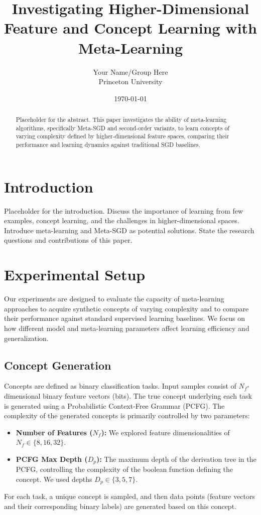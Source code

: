 \documentclass[11pt, a4paper]{article}
\title{Investigating Higher-Dimensional Feature and Concept Learning with Meta-Learning}
\author{Your Name/Group Here \\ Princeton University} %
\date{\today}
\begin{document}
\maketitle
\begin{abstract}
Placeholder for the abstract. This paper investigates the ability of meta-learning algorithms, specifically Meta-SGD and second-order variants, to learn concepts of varying complexity defined by higher-dimensional feature spaces, comparing their performance and learning dynamics against traditional SGD baselines.
\end{abstract}

\section{Introduction}
Placeholder for the introduction.
Discuss the importance of learning from few examples, concept learning, and the challenges in higher-dimensional spaces.
Introduce meta-learning and Meta-SGD as potential solutions.
State the research questions and contributions of this paper.

\section{Experimental Setup}
\label{sec:experimental_setup}

Our experiments are designed to evaluate the capacity of meta-learning approaches to acquire synthetic concepts of varying complexity and to compare their performance against standard supervised learning baselines. We focus on how different model and meta-learning parameters affect learning efficiency and generalization.

\subsection{Concept Generation}
Concepts are defined as binary classification tasks. Input samples consist of $N_f$-dimensional binary feature vectors (bits). The true concept underlying each task is generated using a Probabilistic Context-Free Grammar (PCFG). The complexity of the generated concepts is primarily controlled by two parameters:
\begin{itemize}
    \item \textbf{Number of Features ($N_f$):} We explored feature dimensionalities of $N_f \in \{8, 16, 32\}$.
    \item \textbf{PCFG Max Depth ($D_p$):} The maximum depth of the derivation tree in the PCFG, controlling the complexity of the boolean function defining the concept. We used depths $D_p \in \{3, 5, 7\}$.
\end{itemize}
For each task, a unique concept is sampled, and then data points (feature vectors and their corresponding binary labels) are generated based on this concept.
\end{document}
